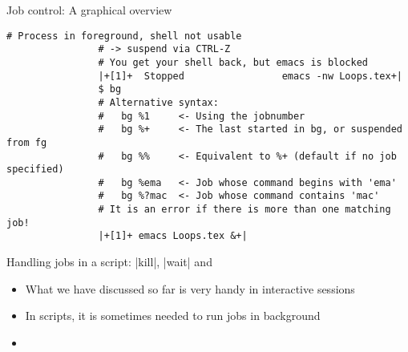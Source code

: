 \begin{frame}[fragile]{Job control: A graphical overview}
\begin{overlayarea}{\textwidth}{0.7\textheight}
\begin{onlyenv}
\begin{lstlisting}[style=MyBash, xrightmargin=2mm, xleftmargin=2mm, firstnumber=26]
                # Process in foreground, shell not usable
                # -> suspend via CTRL-Z 
                # You get your shell back, but emacs is blocked
                |+[1]+  Stopped                 emacs -nw Loops.tex+|
                $ bg 
                # Alternative syntax:
                #   bg %1     <- Using the jobnumber
                #   bg %+     <- The last started in bg, or suspended from fg
                #   bg %%     <- Equivalent to %+ (default if no job specified)
                #   bg %ema   <- Job whose command begins with 'ema'
                #   bg %?mac  <- Job whose command contains 'mac'
                # It is an error if there is more than one matching job!
                |+[1]+ emacs Loops.tex &+|
            \end{lstlisting}
        \end{onlyenv}
    \end{overlayarea}
\end{frame}
\begin{frame}{Handling jobs in a script: \bash|kill|, \bash|wait| and \PB{\texttt{\$!}}}
    \begin{itemize}
        \item What we have discussed so far is very handy in interactive sessions
        \item In scripts, it is sometimes needed to run jobs in background
        \item 
    \end{itemize}
\end{frame}












